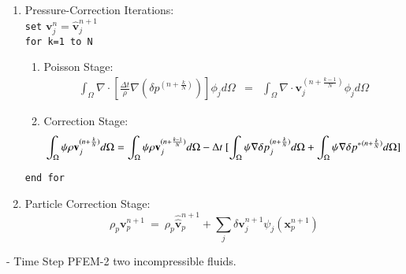 \begin{program}[htbp]
{\begin{enumerate}
	    \item Pressure-Correction Iterations: \\
	    \texttt{set} $\mathbf{v}_j^n = \widehat{\mathbf{v}}^{n+1}_{j}$ \\
	    \texttt{for k=1 to N}
	    \begin{enumerate}
	     \item Poisson Stage: 
	     \begin{eqnarray}\label{Step5a2fluids}
	      \int_{\Omega} \nabla \cdot [\frac{\Delta t}{\rho}\nabla(\delta p^{(n+\frac{k}{N})})] \phi_j d\Omega &=& \int_{\Omega} \nabla \cdot \mathbf{v}_j^{(n+\frac{k-1}{N})} \phi_j d\Omega
	    \end{eqnarray}	    
	    \item Correction Stage:
	     \begin{equation}\label{Step5b2fluids}
	      \int_{\Omega} \psi \rho \vv_j^{(n+\frac{k}{N})} d\Omega = \int_{\Omega} \psi \rho \vv_j^{(n+\frac{k-1}{N})} d\Omega - \Delta t \ [\int_{\Omega} \psi \nabla \delta p_j^{(n+\frac{k}{N})} d\Omega + \int_{\Omega} \psi \nabla \delta {p^*}^{(n+\frac{k}{N})} d\Omega]
	    \end{equation}
	    \end{enumerate}
	  \texttt{end for}
	  \item Particle Correction Stage:
	  \begin{equation}\label{Step6b}
	  \rho_p \mathbf{v}_p^{n+1}\  = \ \rho_p \widehat{\widehat{\mathbf{v}}}_p^{n+1} + \sum_{j} \delta \mathbf{v}_j^{n+1} \psi_j(\mathbf{x}_{p}^{n+1})
	  \end{equation}
	\end{enumerate}
	\caption{- Time Step PFEM-2 two incompressible fluids.}
	\label{program:twofluids}
      }
      \end{program}
